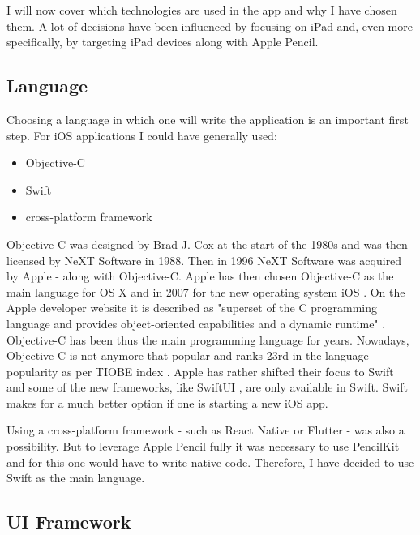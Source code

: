 I will now cover which technologies are used in the app and why I have chosen them. A lot of decisions have been influenced by focusing on iPad and, even more specifically, by targeting iPad devices along with Apple Pencil. 

\subsection{Language}

Choosing a language in which one will write the application is an important first step. For iOS applications I could have generally used:
\begin{itemize}
    \item Objective-C
    \item Swift
    \item cross-platform framework
\end{itemize}

Objective-C was designed by Brad J. Cox at the start of the 1980s and was then licensed by NeXT Software in 1988. Then in 1996 NeXT Software was acquired by Apple - along with Objective-C. Apple has then chosen Objective-C as the main language for OS X and in 2007 for the new operating system iOS \cite{objective-c-programming}. On the Apple developer website it is described as "superset of the C programming language and provides object-oriented capabilities and a dynamic runtime" \cite{objective-c}. Objective-C has been thus the main programming language for years. Nowadays, Objective-C is not anymore that popular and ranks 23rd in the language popularity as per TIOBE index \cite{tiobe-index}. Apple has rather shifted their focus to Swift and some of the new frameworks, like SwiftUI \cite{swiftui}, are only available in Swift. Swift makes for a much better option if one is starting a new iOS app.

Using a cross-platform framework - such as React Native \cite{react-native} or Flutter \cite{flutter} - was also a possibility. But to leverage Apple Pencil fully it was necessary to use PencilKit \cite{pencilkit} and for this one would have to write native code. Therefore, I have decided to use Swift as the main language.

\subsection{UI Framework}

